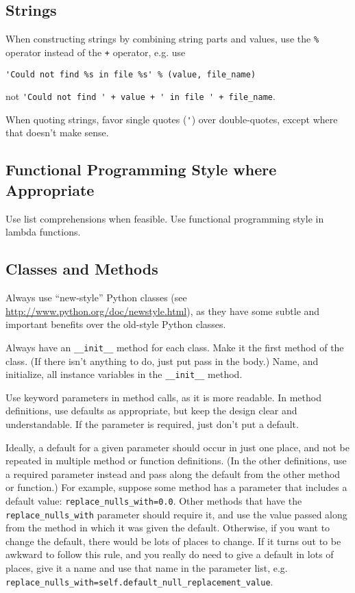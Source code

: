 \subsection{Strings}

When constructing strings by combining string parts and values, use the
\verb|%| operator instead of the \verb|+| operator, e.g. use

\begin{verbatim}
'Could not find %s in file %s' % (value, file_name)
\end{verbatim}

not \verb|'Could not find ' + value + ' in file ' + file_name|.

When quoting strings, favor single quotes (\verb|'|) over double-quotes, except
where that doesn't make sense.


\subsection{Functional Programming Style where Appropriate}

Use list comprehensions when feasible.  Use functional programming style in
lambda functions.


\subsection{Classes and Methods}

Always use ``new-style'' Python classes (see
\url{http://www.python.org/doc/newstyle.html}), as they have some subtle and
important benefits over the old-style Python classes.

Always have an \verb|__init__| method for each class.  Make it the first
method of the class.  (If there isn't anything to do, just put pass in the
body.)  Name, and initialize, all instance variables in the
\verb|__init__| method.

Use keyword parameters in method calls, as it is more readable.
In method definitions, use defaults as appropriate, but keep the design
clear and understandable. If the parameter is required, just don't put a
default.

Ideally, a default for a given parameter should occur in just one
place, and not be repeated in multiple method or function definitions.  (In
the other definitions, use a required parameter instead and pass along the default
from the other method or function.)  For example, suppose some method has a
parameter that includes a default value: \verb|replace_nulls_with=0.0|.  Other
methods that have the \verb|replace_nulls_with| parameter should require it,
and use the value passed along from the method in which it was given the default.
Otherwise, if you want to change the default, there would be lots of places to change.
If it turns out to be awkward to follow this rule, and you really do need to give a default
in lots of places, give it a name and use that name in the parameter list, e.g.
\verb|replace_nulls_with=self.default_null_replacement_value|.


